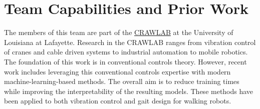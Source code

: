 \documentclass[12 pt]{article}
\begin{document}
\section{Team Capabilities and Prior Work}
\label{sec:capability}
\vspace{-0.2in}
%
The members of this team are part of the \href{https://userweb.ucs.louisiana.edu/~jev9637/}{CRAWLAB} at the University of Louisiana at Lafayette. Research in the CRAWLAB ranges from vibration control of cranes and cable driven systems to industrial automation to mobile robotics. The foundation of this work is in conventional controls theory. However, recent work includes leveraging this conventional controls expertise with modern machine-learning-based methods. The overall aim is to reduce training times while improving the interpretability of the resulting models. These methods have been applied to both vibration control and gait design for walking robots.
\end{document}
